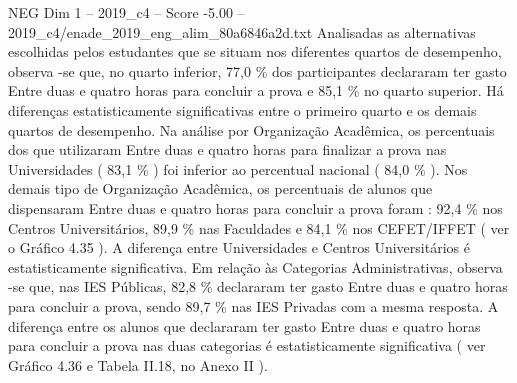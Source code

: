 \begin{textsample}{NEG Dim 1 – 2019\_c4 – Score -5.00 – 2019\_c4/enade\_2019\_eng\_alim\_80a6846a2d.txt}
Analisadas as alternativas escolhidas pelos estudantes que se situam nos diferentes quartos de desempenho, observa -se que, no quarto inferior, 77,0 \% dos participantes declararam ter gasto Entre duas e quatro horas para concluir a prova e 85,1 \% no quarto superior.
Há diferenças estatisticamente significativas entre o primeiro quarto e os demais quartos de desempenho.
Na análise por Organização Acadêmica, os percentuais dos que utilizaram Entre duas e quatro horas para finalizar a prova nas Universidades ( 83,1 \% ) foi inferior ao percentual nacional ( 84,0 \% ).
Nos demais tipo de Organização Acadêmica, os percentuais de alunos que dispensaram Entre duas e quatro horas para concluir a prova foram : 92,4 \% nos Centros Universitários, 89,9 \% nas Faculdades e 84,1 \% nos CEFET/IFFET ( ver o Gráfico 4.35 ).
A diferença entre Universidades e Centros Universitários é estatisticamente significativa.
Em relação às Categorias Administrativas, observa -se que, nas IES Públicas, 82,8 \% declararam ter gasto Entre duas e quatro horas para concluir a prova, sendo 89,7 \% nas IES Privadas com a mesma resposta.
A diferença entre os alunos que declararam ter gasto Entre duas e quatro horas para concluir a prova nas duas categorias é estatisticamente significativa ( ver Gráfico 4.36 e Tabela II.18, no Anexo II ).

\end{textsample}
